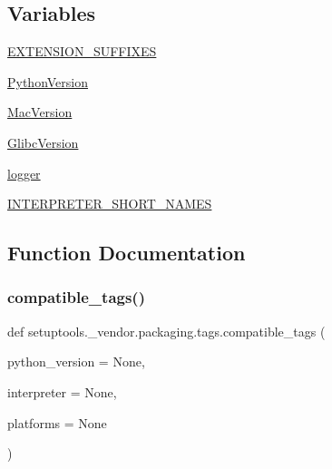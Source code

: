 \subsection*{Variables}
\begin{DoxyCompactItemize}
\item 
\hyperlink{namespacesetuptools_1_1__vendor_1_1packaging_1_1tags_a9213cd3d53cd9e61cd14a55c18415084}{E\+X\+T\+E\+N\+S\+I\+O\+N\+\_\+\+S\+U\+F\+F\+I\+X\+ES}
\item 
\hyperlink{namespacesetuptools_1_1__vendor_1_1packaging_1_1tags_ab4b7e246dca78f77831972b1d8a73b9e}{Python\+Version}
\item 
\hyperlink{namespacesetuptools_1_1__vendor_1_1packaging_1_1tags_a5f406bc37fa46785c8962cb2c633df04}{Mac\+Version}
\item 
\hyperlink{namespacesetuptools_1_1__vendor_1_1packaging_1_1tags_a59c3660c3a5c77eace7036bbfbe5f6b2}{Glibc\+Version}
\item 
\hyperlink{namespacesetuptools_1_1__vendor_1_1packaging_1_1tags_ad5d5bc1d42f22531374657dd21cdd978}{logger}
\item 
\hyperlink{namespacesetuptools_1_1__vendor_1_1packaging_1_1tags_ad20bc26b915c1edea100883b8fed712a}{I\+N\+T\+E\+R\+P\+R\+E\+T\+E\+R\+\_\+\+S\+H\+O\+R\+T\+\_\+\+N\+A\+M\+ES}
\end{DoxyCompactItemize}


\subsection{Function Documentation}
\mbox{\label{namespacesetuptools_1_1__vendor_1_1packaging_1_1tags_a798b9826e4d2530785433a33c87f3256}} 
\subsubsection{\texorpdfstring{compatible\+\_\+tags()}{compatible\_tags()}}
{\footnotesize\ttfamily def setuptools.\+\_\+vendor.\+packaging.\+tags.\+compatible\+\_\+tags (\begin{DoxyParamCaption}\item[{}]{python\+\_\+version = {\ttfamily None},  }\item[{}]{interpreter = {\ttfamily None},  }\item[{}]{platforms = {\ttfamily None} }\end{DoxyParamCaption})}

